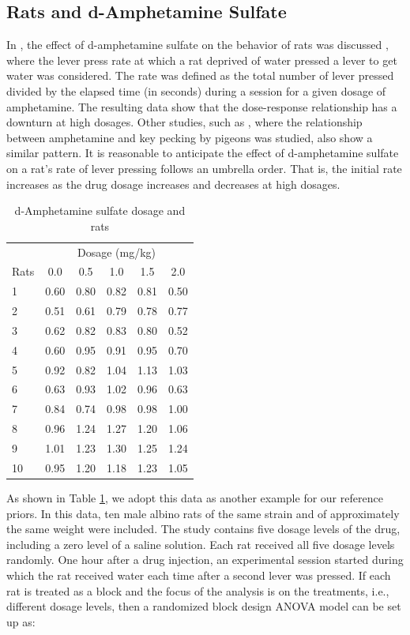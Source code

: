 \documentclass[Proceedings]{ascelike}
\begin{document}
\subsection{Rats and d-Amphetamine
Sulfate}
In \cite{Heffner1974}, the effect of d-amphetamine sulfate on the behavior of rats was discussed , where the lever press rate at which a rat deprived of water pressed a lever to get water was considered. The rate was defined as the total number of lever pressed divided by the elapsed time (in seconds) during a session for a given dosage of amphetamine. The resulting data show that the dose-response relationship has a downturn at high dosages. Other studies, such as \cite{Dews1958}, where the relationship between amphetamine and key pecking by pigeons was studied, also show a similar pattern. It is reasonable to anticipate the effect of d-amphetamine sulfate on a rat's rate of lever pressing follows an umbrella order. That is, the initial rate increases as the drug dosage increases and  decreases at high dosages. 
\begin{table}[h!]
  \centering
  \caption{d-Amphetamine sulfate dosage and rats}
\begin{tabular}{|l|c|c|c|c|c|}
    \hline
 & \multicolumn{5}{|c|}{Dosage (mg/kg)}   \\

\cline{2-6}
Rats & 0.0 &0.5 & 1.0 & 1.5 & 2.0 \\
\hline
1   &0.60 	&0.80 	&0.82 	&0.81 	&0.50\\
2 	&0.51 	&0.61 	&0.79 	&0.78 	&0.77\\
3 	&0.62 	&0.82 	&0.83 	&0.80 	&0.52\\
4 	&0.60 	&0.95 	&0.91 	&0.95 	&0.70\\
5 	&0.92 	&0.82 	&1.04 	&1.13 	&1.03\\
6 	&0.63 	&0.93 	&1.02 	&0.96 	&0.63\\
7 	&0.84 	&0.74 	&0.98 	&0.98 	&1.00\\
8 	&0.96 	&1.24 	&1.27 	&1.20 	&1.06\\
9 	&1.01 	&1.23 	&1.30 	&1.25 	&1.24\\
10 	&0.95 	&1.20 	&1.18 	&1.23 	&1.05\\
\hline
\end{tabular}
  \label{tab:rats}
\end{table}
As shown in Table \ref{tab:rats}, we adopt this data as another example for our reference priors. In this data, ten male albino rats of the same strain and of approximately the same weight were included. The study contains five dosage levels of the drug, including a zero level of a saline solution. Each rat received all five dosage levels randomly. One hour after a drug injection, an experimental session started during which the rat received water each time after a second lever was pressed. If each rat is treated as a block and the focus of the analysis is on the treatments, i.e., different dosage levels, then a randomized block design ANOVA model can be set up as:
\end{document}
